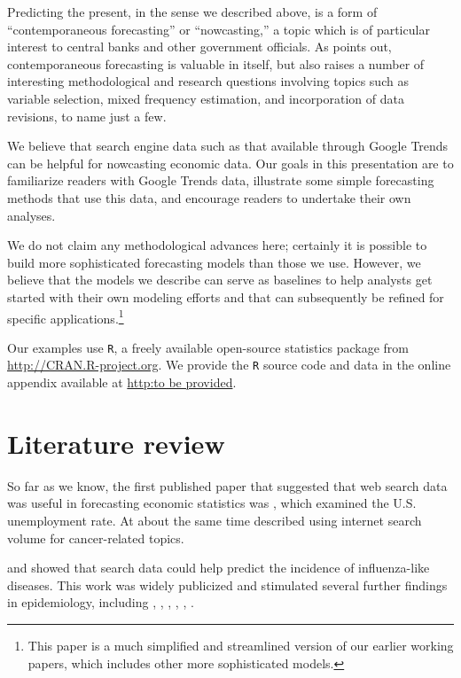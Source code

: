 \documentclass[12pt, oneside]{article}
\begin{document}
Predicting the present, in the sense we described above, is a form of
``contemporaneous forecasting'' or ``nowcasting,'' a topic which is of
particular interest to central banks and other government officials.
As \cite{Castle09} points out, contemporaneous forecasting is valuable
in itself, but also raises a number of interesting methodological and
research questions involving topics such as variable selection, mixed
frequency estimation, and incorporation of data revisions, to name
just a few.

We believe that search engine data such as that available through
Google Trends can be helpful for nowcasting economic data.  Our goals
in this presentation are to familiarize readers with Google Trends
data, illustrate some simple forecasting methods that use this data,
and encourage readers to undertake their own analyses.  

We do not claim any methodological advances here; certainly it is
possible to build more sophisticated forecasting models than those we
use.  However, we believe that the models we describe can serve as
baselines to help analysts get started with their own modeling efforts
and that can subsequently be refined for specific
applications.\footnote{This paper is a much simplified and streamlined
  version of our earlier working papers, \cite{Choi09a,Choi09b} which
  includes other more sophisticated models.}

Our examples use {\tt R}, a freely available open-source statistics
package from \url{http://CRAN.R-project.org}.  We provide the {\tt R}
source code and data in the online appendix available at \url{http:to
  be provided}.

\section{Literature review}

So far as we know, the first published paper that suggested that web
search data was useful in forecasting economic statistics was
\citet{Ettredge05}, which examined the U.S. unemployment rate.  At
about the same time \citet{Cooper05} described using internet search
volume for cancer-related topics.

\citet{Polgreen08} and \citet{Ginsberg09} showed that search data
could help predict the incidence of influenza-like diseases.  This
work was widely publicized and stimulated several further findings in
epidemiology, including \citet{Brownstein09}, \citet{Corley09},
\citet{Hulth09}, \citet{Turbelin09}, \citet{Valdivia10},
\citet{Wilson09}.
\end{document}
